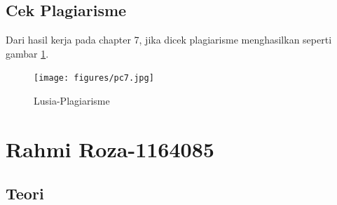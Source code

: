 \subsection{Cek Plagiarisme}
\par Dari hasil kerja pada chapter 7, jika dicek plagiarisme menghasilkan seperti gambar \ref{7D1}.
		\begin{figure}[!hbtp]
		\centering
		\texttt{[image: figures/pc7.jpg]}
		\caption{Lusia-Plagiarisme}
		\label{7D1}
		\end{figure}




\section{Rahmi Roza-1164085}
\subsection{Teori}
